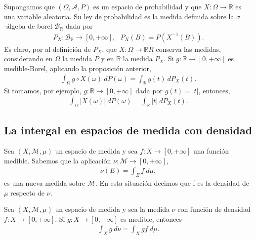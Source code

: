 \begin{ejemplo}
Supongamos que $(\Omega, \mathcal{A}, P)$ es un espacio de probabilidad y que $X: \Omega \longrightarrow \mathbb{R}$ es una variable aleatoria. Su ley de probabilidad es la medida definida sobre la $\sigma$-álgeba de borel $\mathcal{B}_{\mathbb{R}}$ dada por
\begin{align*}
    P_X: \mathcal{B}_{\mathbb{R}} \longrightarrow [0,+\infty], \ \ \ P_X(B) = P(X^{-1}(B)).
\end{align*}
Es claro, por al definición de $P_X$, que $X: \Omega \longrightarrow \mathbb{R}R$ conserva las medidas, considerando en $\Omega$ la medida $P$ y en $\mathbb{R}$ la medida $P_X$. Si $g: \mathbb{R} \longrightarrow [0,+\infty]$ es medible-Borel, aplicando la proposición anterior,
\begin{align*}
    \int_{\Omega}{g \circ X(\omega) \ dP(\omega)} = \int_{\mathbb{R}}{g(t) \ dP_X(t)}.
\end{align*}
Si tomamos, por ejemplo, $g: \mathbb{R} \longrightarrow [0,+\infty]$ dada por $g(t) = |t|$, entonces,
\begin{align*}
    \int_{\Omega}{|X(\omega)| \ dP(\omega)} = \int_{\mathbb{R}}{|t| \ dP_X(t)}.
\end{align*}
\end{ejemplo}

\subsection{La intergal en espacios de medida con densidad}

\begin{defi}
Sea $(X, \mathcal{M},\mu)$ un espacio de medida y sea $f: X \longrightarrow [0,+\infty]$ una función medible. Sabemos que la aplicación $\nu: \mathcal{M} \longrightarrow [0,+\infty]$, 
\begin{align*}
    \nu(E) = \int_{E}{f \ d\mu},
\end{align*}
es una nueva medida sobre $\mathcal{M}$. En esta situación decimos que f es la densidad de $\mu$ respecto de $\nu$.
\end{defi}

\begin{teo}
Sea $(X, \mathcal{M},\mu)$ un espacio de medida y sea la medida $\nu$ con función de densidad $f: X \longrightarrow [0,+\infty]$. Si $g: X \longrightarrow [0,+\infty]$ es medible, entonces
\begin{align*}
    \int_{X}{g \ d\nu} = \int_{X}{gf \ d\mu}.
\end{align*}
\end{teo}


